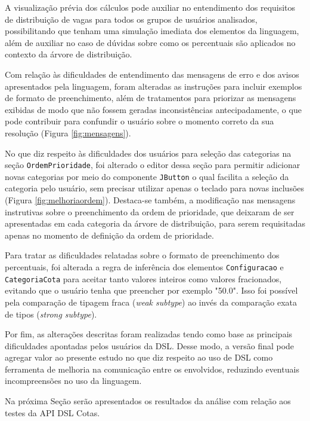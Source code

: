\clearpage



A visualização prévia dos cálculos pode auxiliar no entendimento dos requisitos de distribuição de vagas para todos os grupos de usuários analisados, possibilitando que tenham uma simulação imediata dos elementos da linguagem, além de auxiliar no caso de dúvidas sobre como os percentuais são aplicados no contexto da árvore de distribuição.

Com relação às dificuldades de entendimento das mensagens de erro e dos avisos apresentados pela linguagem, foram alteradas as instruções para incluir exemplos de formato de preenchimento, além de tratamentos para priorizar as mensagens exibidas de modo que não fossem geradas inconsistências antecipadamente, o que pode contribuir para confundir o usuário sobre o momento correto da sua resolução (Figura \ref{fig:mensagens}).



No que diz respeito às dificuldades dos usuários para seleção das categorias na seção \texttt{OrdemPrioridade}, foi alterado o editor dessa seção para permitir adicionar novas categorias por meio do componente \texttt{JButton} o qual facilita a seleção da categoria pelo usuário, sem precisar utilizar apenas o teclado para novas inclusões (Figura \ref{fig:melhoriaordem}). Destaca-se também, a modificação nas mensagens instrutivas sobre o preenchimento da ordem de prioridade, que deixaram de ser apresentadas em cada categoria da árvore de distribuição, para serem requisitadas apenas no momento de definição da ordem de prioridade.



Para tratar as dificuldades relatadas sobre o formato de preenchimento dos percentuais, foi alterada a regra de inferência dos elementos \texttt{Configuracao} e \texttt{CategoriaCota} para aceitar tanto valores inteiros como valores fracionados, evitando que o usuário tenha que preencher por exemplo "50.0". Isso foi possível pela comparação de tipagem fraca (\textit{weak subtype}) ao invés da comparação exata de tipos (\textit{strong subtype}).



\newpage
Por fim, as alterações descritas foram realizadas tendo como base as principais dificuldades apontadas pelos usuários da DSL. Desse modo, a versão final pode agregar valor ao presente estudo no que diz respeito ao uso de DSL como ferramenta de melhoria na comunicação entre os envolvidos, reduzindo eventuais incompreensões no uso da linguagem.

Na próxima Seção serão apresentados os resultados da análise com relação aos testes da \gls{API} DSL Cotas.